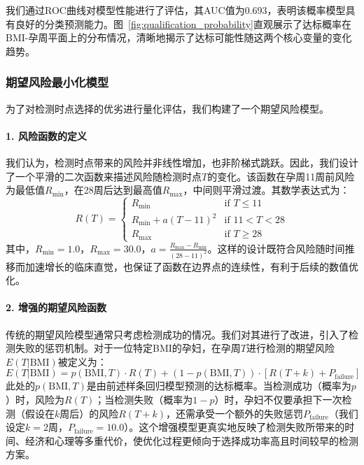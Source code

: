 我们通过ROC曲线对模型性能进行了评估，其AUC值为0.693，表明该概率模型具有良好的分类预测能力。图~\ref{fig:qualification_probability}直观展示了达标概率在BMI-孕周平面上的分布情况，清晰地揭示了达标可能性随这两个核心变量的变化趋势。

\subsubsection{期望风险最小化模型}

为了对检测时点选择的优劣进行量化评估，我们构建了一个期望风险模型。

\paragraph{1. 风险函数的定义}
我们认为，检测时点带来的风险并非线性增加，也非阶梯式跳跃。因此，我们设计了一个平滑的二次函数来描述风险随检测时点$T$的变化。该函数在孕周11周前风险为最低值$R_{\min}$，在28周后达到最高值$R_{\max}$，中间则平滑过渡。其数学表达式为：
\begin{equation}
    R(T) = 
    \begin{cases} 
        R_{\min} & \text{if } T \le 11 \\
        R_{\min} + a(T - 11)^2 & \text{if } 11 < T < 28 \\
        R_{\max} & \text{if } T \ge 28 
    \end{cases}
\end{equation}
其中，$R_{\min} = 1.0$，$R_{\max} = 30.0$，$a = \frac{R_{\max} - R_{\min}}{(28-11)^2}$。这样的设计既符合风险随时间推移而加速增长的临床直觉，也保证了函数在边界点的连续性，有利于后续的数值优化。

\paragraph{2. 增强的期望风险函数}
传统的期望风险模型通常只考虑检测成功的情况。我们对其进行了改进，引入了检测失败的惩罚机制。对于一位特定BMI的孕妇，在孕周$T$进行检测的期望风险$E(T | \text{BMI})$被定义为：
\begin{equation}
    E(T | \text{BMI}) = p(\text{BMI}, T) \cdot R(T) + (1 - p(\text{BMI}, T)) \cdot [R(T+k) + P_{\text{failure}}]
\end{equation}
此处的$p(\text{BMI}, T)$是由前述样条回归模型预测的达标概率。当检测成功（概率为$p$）时，风险为$R(T)$；当检测失败（概率为$1-p$）时，孕妇不仅要承担下一次检测（假设在$k$周后）的风险$R(T+k)$，还需承受一个额外的失败惩罚$P_{\text{failure}}$（我们设定$k=2$周，$P_{\text{failure}}=10.0$）。这个增强模型更真实地反映了检测失败所带来的时间、经济和心理等多重代价，使优化过程更倾向于选择成功率高且时间较早的检测方案。

